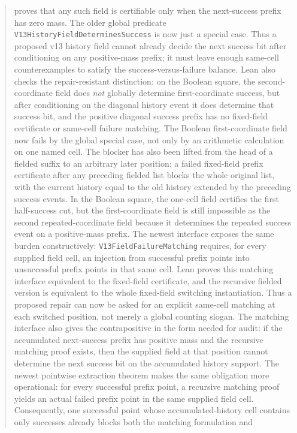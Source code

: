 \documentclass[11pt]{article}
\theoremstyle{remark}
\begin{document}
\begin{abstract}
proves that any such field is certifiable only when the next-success prefix has zero mass.  The
older global predicate \texttt{V13HistoryFieldDeterminesSuccess} is now just a special case.  Thus
a proposed v13 history field cannot already decide the next success bit after conditioning on any
positive-mass prefix; it must leave enough same-cell counterexamples to satisfy the
success-versus-failure balance.  Lean also checks the repair-resistant distinction: on the Boolean
square, the second-coordinate field does \emph{not} globally determine first-coordinate success,
but after conditioning on the diagonal history event it does determine that success bit, and the
positive diagonal success prefix has no fixed-field certificate or same-cell failure matching.  The
Boolean first-coordinate field now fails by the global special case, not only by an arithmetic
calculation on one named cell.  The blocker has also been lifted from the head of a fielded suffix
to an arbitrary
later position: a failed fixed-field prefix certificate after any preceding fielded list blocks the
whole original list, with the current history equal to the old history extended by the preceding
success events.  In the Boolean square, the one-cell field certifies the first half-success cut, but
the first-coordinate field is still impossible as the second repeated-coordinate field because it
determines the repeated success event on a positive-mass prefix.  The newest interface exposes the
same burden constructively: \texttt{V13FieldFailureMatching} requires, for every supplied field
cell, an injection from successful prefix points into unsuccessful prefix points in that same cell.
Lean proves this matching interface equivalent to the fixed-field certificate, and the recursive
fielded version is equivalent to the whole fixed-field switching instantiation.  Thus a proposed
repair can now be asked for an explicit same-cell matching at each switched position, not merely a
global counting slogan.  The matching interface also gives the contrapositive in the form needed
for audit: if the accumulated next-success prefix has positive mass and the recursive matching
proof exists, then the supplied field at that position cannot determine the next success bit on the
accumulated history support.  The newest pointwise extraction theorem makes the same obligation
more operational: for every successful prefix point, a recursive matching proof yields an actual
failed prefix point in the same supplied field cell.  Consequently, one successful point whose
accumulated-history cell contains only successes already blocks both the matching formulation and

\end{abstract}
\end{document}
